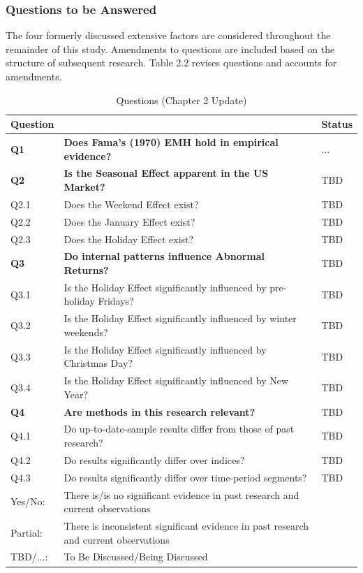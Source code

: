 \documentclass[11pt, english]{article}
\begin{document}
		\subsubsection{Questions to be Answered}

		The four formerly discussed extensive factors are considered throughout the remainder of this study. Amendments to questions are included based on the structure of subsequent research. Table 2.2 revises questions and accounts for amendments.

		\begin{table}[h]
			\scriptsize
			\renewcommand{\arraystretch}{1.25}
        	\begin{center}
        	\begin{tabular}{lll}
         	       	\textbf{Question} & & \textbf{Status} \\ 
         	       	\hline
         	       	\textbf{Q1} & \textbf{Does Fama’s (1970) EMH hold in empirical evidence?} & ... \\
         	       	\textbf{Q2} & \textbf{Is the Seasonal Effect apparent in the US Market?} & TBD \\
         	       	Q2.1 & Does the Weekend Effect exist? & TBD \\
         	       	Q2.2 & Does the January Effect exist? & TBD \\
         	       	Q2.3 & Does the Holiday Effect exist? & TBD \\
         	       	\textbf{Q3} & \textbf{Do internal patterns influence Abnormal Returns?} & TBD \\
         	       	Q3.1 & Is the Holiday Effect significantly influenced by pre-holiday Fridays? & TBD \\
         	       	Q3.2 & Is the Holiday Effect significantly influenced by winter weekends? & TBD \\
         	       	Q3.3 & Is the Holiday Effect significantly influenced by Christmas Day? & TBD \\
         	       	Q3.4 & Is the Holiday Effect significantly influenced by New Year? & TBD \\
			\textbf{Q4} & \textbf{Are methods in this research relevant?} & TBD \\
			Q4.1 & Do up-to-date-sample results differ from those of past research? & TBD \\
			Q4.2 & Do results significantly differ over indices? & TBD \\
			Q4.3 & Do results significantly differ over time-period segments? & TBD \\
			\hline
			Yes/No: & There is/is no significant evidence in past research and current observations \\
			Partial: & There is inconsistent significant evidence in past research and current observations \\
			TBD/...: & To Be Discussed/Being Discussed \\
			\hline
        	\end{tabular}                            
        		\caption {Questions (Chapter 2 Update)}
        	\end{center}
        	\end{table}
\end{document}
